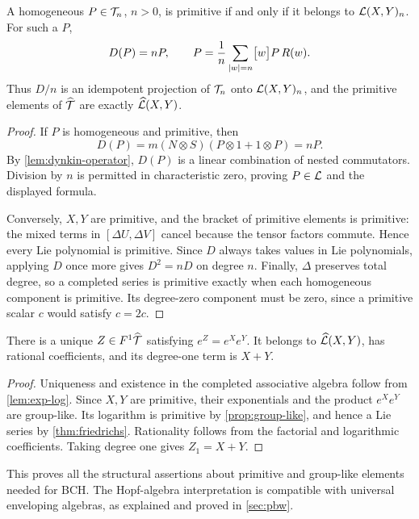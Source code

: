 \begin{theorem}\label{thm:friedrichs}
A homogeneous $P\in\mathcal T_n$, $n>0$, is primitive if and only if it belongs to $\mathcal L(X,Y)_n$. For such a $P$,
\begin{equation}\label{eq:dsw}
 D(P)=nP,\qquad
 P=\frac1n\sum_{|w|=n}\bigl[w\bigr]P\,R(w).
\end{equation}
Thus $D/n$ is an idempotent projection of $\mathcal T_n$ onto $\mathcal L(X,Y)_n$, and the primitive elements of $\widehat{\mathcal T}$ are exactly $\widehat{\mathcal L}(X,Y)$.
\end{theorem}
\begin{proof}
If $P$ is homogeneous and primitive, then
\[
 D(P)=m(N\otimes S)(P\otimes1+1\otimes P)=nP.
\]
By \cref{lem:dynkin-operator}, $D(P)$ is a linear combination of nested commutators. Division by $n$ is permitted in characteristic zero, proving $P\in\mathcal L$ and the displayed formula.

Conversely, $X,Y$ are primitive, and the bracket of primitive elements is primitive: the mixed terms in $[\Delta U,\Delta V]$ cancel because the tensor factors commute. Hence every Lie polynomial is primitive. Since $D$ always takes values in Lie polynomials, applying $D$ once more gives $D^2=nD$ on degree $n$. Finally, $\Delta$ preserves total degree, so a completed series is primitive exactly when each homogeneous component is primitive. Its degree-zero component must be zero, since a primitive scalar $c$ would satisfy $c=2c$.
\end{proof}

\begin{theorem}\label{thm:formal-bch}
There is a unique $Z\in F^1\widehat{\mathcal T}$ satisfying $e^Z=e^Xe^Y$. It belongs to $\widehat{\mathcal L}(X,Y)$, has rational coefficients, and its degree-one term is $X+Y$.
\end{theorem}
\begin{proof}
Uniqueness and existence in the completed associative algebra follow from \cref{lem:exp-log}. Since $X,Y$ are primitive, their exponentials and the product $e^Xe^Y$ are group-like. Its logarithm is primitive by \cref{prop:group-like}, and hence a Lie series by \cref{thm:friedrichs}. Rationality follows from the factorial and logarithmic coefficients. Taking degree one gives $Z_1=X+Y$.
\end{proof}
This proves all the structural assertions about primitive and group-like elements needed for BCH. The Hopf-algebra interpretation is compatible with universal enveloping algebras, as explained and proved in \cref{sec:pbw}.

